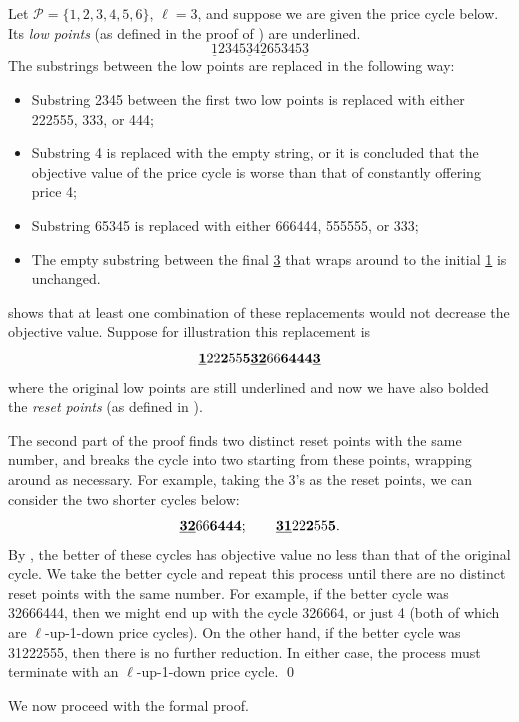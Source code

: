 \documentclass[format=acmsmall, review=false]{acmart}
\newcommand{\cP}{\mathcal{P}}
\newcommand{\luid}{$\ell$-up-1-down\xspace}
\begin{document}
\begin{example}
Let $\cP=\{1,2,3,4,5,6\}$, $\ell=3$, and suppose we are given the price cycle below.  Its \textit{low points} (as defined in the proof of ) are underlined.
$$
\underline{1}2345\underline{3}4\underline{2}65345\underline{3}
$$
The substrings between the low points are replaced in the following way:
\begin{itemize}
\item Substring 2345 between the first two low points is replaced with either 222555, 333, or 444;
\item Substring 4 is replaced with the empty string, or it is concluded that the objective value of the price cycle is worse than that of constantly offering price 4;
\item Substring 65345 is replaced with either 666444, 555555, or 333;
\item The empty substring between the final \underline{3} that wraps around to the initial \underline{1} is unchanged.
\end{itemize}
 shows that at least one combination of these replacements would not decrease the objective value.
Suppose for illustration this replacement is
$$
\textbf{\underline{1}}22\textbf{2}55\textbf{5\underline{3}\underline{2}}66\textbf{6444\underline{3}}
$$
where the original low points are still underlined and now we have also bolded the \textit{reset points} (as defined in ).

The second part of the proof finds two distinct reset points with the same number, and breaks the cycle into two starting from these points, wrapping around as necessary.  For example, taking the 3's as the reset points, we can consider the two shorter cycles below:
$$
\textbf{\underline{3}\underline{2}}66\textbf{6444}; \qquad \textbf{\underline{3}}\textbf{\underline{1}}22\textbf{2}55\textbf{5}.
$$
By , the better of these cycles has objective value no less than that of the original cycle.
We take the better cycle and repeat this process until there are no distinct reset points with the same number.  For example, if the better cycle was 32666444, then we might end up with the cycle 326664, or just 4 (both of which are \luid price cycles).  On the other hand, if the better cycle was 31222555, then there is no further reduction.
In either case, the process must terminate with an \luid price cycle. \qed
\end{example}

We now proceed with the formal proof.
\end{document}

